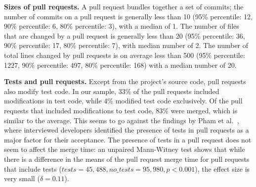 \documentclass{sig-alternate}
\begin{document}
%

\textbf{Sizes of pull requests.}
A pull request bundles together a set of commits; the number of commits on a
pull request is generally less than 10 (95\% percentile: 12, 90\% percentile: 6,
80\% percentile: 3), with a median of 1. The number of files that are changed by
a pull request is generally less than 20 (95\% percentile: 36, 90\% percentile:
17, 80\% percentile: 7), with median number of 2. The number of total lines
changed by pull requests is on average less than 500 (95\% percentile: 1227,
90\% percentile: 497, 80\% percentile: 168) with a median number of 20.

\textbf{Tests and pull requests.} Except from the project's source code, pull
requests also modify test code. In our sample, 33\% of the pull requests
included modifications in test code, while 4\% modified test code exclusively.
Of the pull requests that included modifications to test code, 83\% were merged,
which is similar to the average. This seems to go against the findings by Pham
et al.~\cite{Pham13}, where interviewed developers identified the presence of
tests in pull requests as a major factor for their acceptance. The presence of
tests in a pull request does not seem to affect the merge time: an unpaired
Mann-Witney test shows that while there is a difference in the means of the pull
request merge time for pull requests that include tests ($tests = 45,488,
no\_tests = 95,980, p < 0.001$), the effect size is very small ($\delta =
0.11$).

\end{document}
